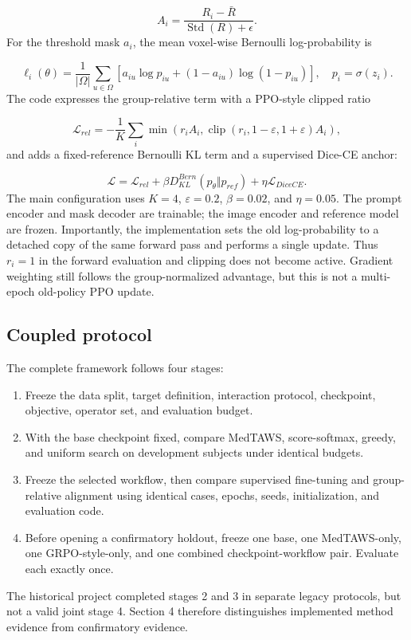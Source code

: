 \documentclass[10pt]{article}
\begin{document}
\[
A_i=\frac{R_i-\bar R}{\operatorname{Std}(R)+\epsilon}.
\]
For the threshold mask \(a_i\), the mean voxel-wise Bernoulli log-probability is

\[
\ell_i(\theta)=\frac{1}{|\Omega|}\sum_{u\in\Omega}
\left[a_{iu}\log p_{iu}+(1-a_{iu})\log(1-p_{iu})\right],
\quad p_i=\sigma(z_i).
\]
The code expresses the group-relative term with a PPO-style clipped ratio

\[
\mathcal L_{rel}=-\frac1K\sum_i
\min(r_iA_i,\operatorname{clip}(r_i,1-\varepsilon,1+\varepsilon)A_i),
\]
and adds a fixed-reference Bernoulli KL term and a supervised Dice-CE anchor:

\[
\mathcal L=\mathcal L_{rel}
+\beta D_{KL}^{Bern}(p_\theta\Vert p_{ref})
+\eta\mathcal L_{DiceCE}.
\]
The main configuration uses \(K=4\), \(\varepsilon=0.2\), \(\beta=0.02\), and \(\eta=0.05\). The prompt encoder and mask decoder are trainable; the image encoder and reference model are frozen. Importantly, the implementation sets the old log-probability to a detached copy of the same forward pass and performs a single update. Thus \(r_i=1\) in the forward evaluation and clipping does not become active. Gradient weighting still follows the group-normalized advantage, but this is not a multi-epoch old-policy PPO update.

\subsection{Coupled protocol}
The complete framework follows four stages:

\begin{enumerate}
\item Freeze the data split, target definition, interaction protocol, checkpoint, objective, operator set, and evaluation budget.
\item With the base checkpoint fixed, compare MedTAWS, score-softmax, greedy, and uniform search on development subjects under identical budgets.
\item Freeze the selected workflow, then compare supervised fine-tuning and group-relative alignment using identical cases, epochs, seeds, initialization, and evaluation code.
\item Before opening a confirmatory holdout, freeze one base, one MedTAWS-only, one GRPO-style-only, and one combined checkpoint-workflow pair. Evaluate each exactly once.
\end{enumerate}
The historical project completed stages 2 and 3 in separate legacy protocols, but not a valid joint stage 4. Section 4 therefore distinguishes implemented method evidence from confirmatory evidence.
\end{document}
